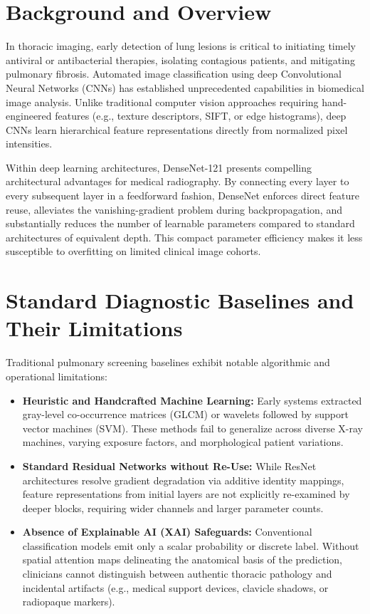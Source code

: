 \documentclass[12pt,a4paper]{report}
\begin{document}
\section{Background and Overview}
In thoracic imaging, early detection of lung lesions is critical to initiating timely antiviral or antibacterial therapies, isolating contagious patients, and mitigating pulmonary fibrosis. Automated image classification using deep Convolutional Neural Networks (CNNs) has established unprecedented capabilities in biomedical image analysis. Unlike traditional computer vision approaches requiring hand-engineered features (e.g., texture descriptors, SIFT, or edge histograms), deep CNNs learn hierarchical feature representations directly from normalized pixel intensities.

Within deep learning architectures, DenseNet-121 presents compelling architectural advantages for medical radiography. By connecting every layer to every subsequent layer in a feedforward fashion, DenseNet enforces direct feature reuse, alleviates the vanishing-gradient problem during backpropagation, and substantially reduces the number of learnable parameters compared to standard architectures of equivalent depth. This compact parameter efficiency makes it less susceptible to overfitting on limited clinical image cohorts.

\section{Standard Diagnostic Baselines and Their Limitations}
Traditional pulmonary screening baselines exhibit notable algorithmic and operational limitations:
\begin{itemize}
    \item \textbf{Heuristic and Handcrafted Machine Learning:} Early systems extracted gray-level co-occurrence matrices (GLCM) or wavelets followed by support vector machines (SVM). These methods fail to generalize across diverse X-ray machines, varying exposure factors, and morphological patient variations.
    \item \textbf{Standard Residual Networks without Re-Use:} While ResNet architectures resolve gradient degradation via additive identity mappings, feature representations from initial layers are not explicitly re-examined by deeper blocks, requiring wider channels and larger parameter counts.
    \item \textbf{Absence of Explainable AI (XAI) Safeguards:} Conventional classification models emit only a scalar probability or discrete label. Without spatial attention maps delineating the anatomical basis of the prediction, clinicians cannot distinguish between authentic thoracic pathology and incidental artifacts (e.g., medical support devices, clavicle shadows, or radiopaque markers).
\end{itemize}
\end{document}

